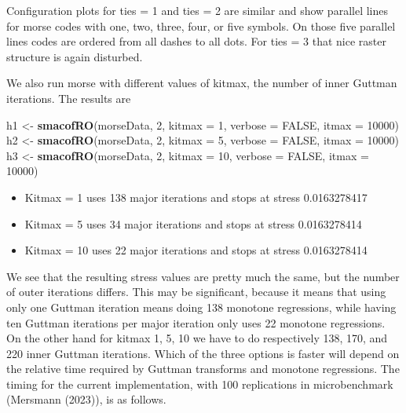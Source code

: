 \documentclass[
  12pt,
]{article}
\newenvironment{Shaded}{\begin{snugshade}}{\end{snugshade}}
\newcommand{\AttributeTok}[1]{\textcolor[rgb]{0.13,0.29,0.53}{#1}}
\newcommand{\ConstantTok}[1]{\textcolor[rgb]{0.56,0.35,0.01}{#1}}
\newcommand{\DecValTok}[1]{\textcolor[rgb]{0.00,0.00,0.81}{#1}}
\newcommand{\FunctionTok}[1]{\textcolor[rgb]{0.13,0.29,0.53}{\textbf{#1}}}
\newcommand{\NormalTok}[1]{#1}
\newcommand{\OtherTok}[1]{\textcolor[rgb]{0.56,0.35,0.01}{#1}}
\providecommand{\tightlist}{%
  \setlength{\itemsep}{0pt}\setlength{\parskip}{0pt}}
\begin{document}
Configuration plots for ties = 1 and ties = 2 are similar and show parallel lines for morse codes
with one, two, three, four, or five symbols. On those five parallel lines codes are ordered from
all dashes to all dots. For ties = 3 that nice raster structure is again disturbed.

We also run morse with different values of kitmax, the number of inner Guttman iterations. The results are

\begin{Shaded}
\begin{Highlighting}[]
\NormalTok{h1 }\OtherTok{\textless{}{-}} \FunctionTok{smacofRO}\NormalTok{(morseData, }\DecValTok{2}\NormalTok{, }\AttributeTok{kitmax =} \DecValTok{1}\NormalTok{, }\AttributeTok{verbose =} \ConstantTok{FALSE}\NormalTok{, }\AttributeTok{itmax =} \DecValTok{10000}\NormalTok{)}
\NormalTok{h2 }\OtherTok{\textless{}{-}} \FunctionTok{smacofRO}\NormalTok{(morseData, }\DecValTok{2}\NormalTok{, }\AttributeTok{kitmax =} \DecValTok{5}\NormalTok{, }\AttributeTok{verbose =} \ConstantTok{FALSE}\NormalTok{, }\AttributeTok{itmax =} \DecValTok{10000}\NormalTok{)}
\NormalTok{h3 }\OtherTok{\textless{}{-}} \FunctionTok{smacofRO}\NormalTok{(morseData, }\DecValTok{2}\NormalTok{, }\AttributeTok{kitmax =} \DecValTok{10}\NormalTok{, }\AttributeTok{verbose =} \ConstantTok{FALSE}\NormalTok{, }\AttributeTok{itmax =} \DecValTok{10000}\NormalTok{)}
\end{Highlighting}
\end{Shaded}

\begin{itemize}
\tightlist
\item
  Kitmax = 1 uses 138 major iterations and stops at stress 0.0163278417
\item
  Kitmax = 5 uses 34 major iterations and stops at stress 0.0163278414
\item
  Kitmax = 10 uses 22 major iterations and stops at stress 0.0163278414
\end{itemize}

We see that the resulting stress values are pretty much the same, but the number of outer iterations differs. This may be significant, because it means that using only one Guttman iteration means doing 138 monotone
regressions, while having ten Guttman iterations per major iteration only uses 22 monotone
regressions. On the other hand for kitmax 1, 5, 10 we have to do respectively 138, 170, and 220 inner Guttman iterations. Which of the three options is faster will depend on the relative time required by Guttman transforms
and monotone regressions. The timing for the current implementation, with 100 replications in microbenchmark
(Mersmann (2023)), is as follows.
\end{document}
